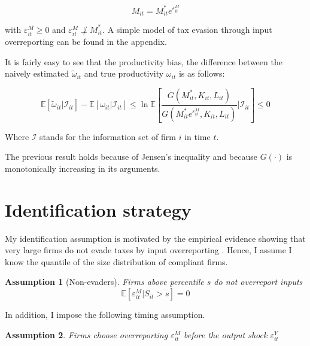 \documentclass[
  12pt]{article}
\newtheorem{ass}{Assumption}
\theoremstyle{definition}
\theoremstyle{remark}
\begin{document}
\[
M_{it}=M^*_{it}e^{\varepsilon^M_{it}}   
\]

with \(\varepsilon_{it}^M\ge0\) and
\(\varepsilon_{it}^M\not\perp M^*_{it}\). A simple model of tax evasion
through input overreporting can be found in the appendix.

It is fairly easy to see that the productivity bias, the difference
between the naively estimated \(\tilde\omega_{it}\) and true
productivity \(\omega_{it}\) is as follows:

\[
 \mathbb{E}[\tilde\omega_{it}|\mathcal{I}_{it}]-
    \mathbb{E}[\omega_{it}|\mathcal{I}_{it}] \le
      \ln\mathbb{E}\left[
        \frac{G(M^*_{it}, K_{it}, L_{it})}{G(M^*_{it}e^{\varepsilon^M_{it}}, K_{it}, L_{it})}\Bigg|\mathcal{I}_{it}\right] \le 0
\]

Where \(\mathcal{I}\) stands for the information set of firm \(i\) in
time \(t\).

The previous result holds because of Jensen's inequality and because
\(G(\cdot)\) is monotonically increasing in its arguments.

\hypertarget{identification-strategy}{%
\section{Identification strategy}\label{identification-strategy}}

My identification assumption is motivated by the empirical evidence
showing that very large firms do not evade taxes by input overreporting
\citep{Carrillo2022}. Hence, I assume I know the quantile of the size
distribution of compliant firms.

\begin{tcolorbox}[enhanced jigsaw, opacityback=0, rightrule=.15mm, arc=.35mm, breakable, left=2mm, toprule=.15mm, bottomrule=.15mm, leftrule=.75mm, colback=white]

\begin{ass}[Non-evaders]\label{ass-comp}
Firms above percentile $s$ do not overreport inputs $$\mathbb{E}[\varepsilon^M_{it}|S_{it}>s]=0$$
\end{ass}

\end{tcolorbox}

In addition, I impose the following timing assumption.

\begin{tcolorbox}[enhanced jigsaw, opacityback=0, rightrule=.15mm, arc=.35mm, breakable, left=2mm, toprule=.15mm, bottomrule=.15mm, leftrule=.75mm, colback=white]

\begin{ass}\label{ass-ind}
Firms choose overreporting $\varepsilon^M_{it}$ \emph{before} the output shock $\varepsilon^Y_{it}$
\end{ass}

\end{tcolorbox}
\end{document}
